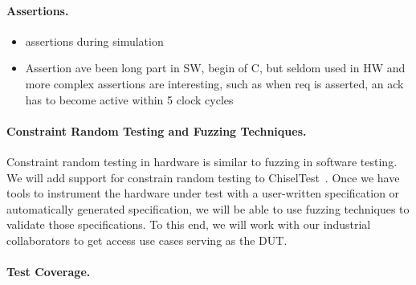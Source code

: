 \documentclass[conference]{IEEEtran}
\begin{document}
\paragraph{Assertions.}

\begin{itemize}
\item assertions during simulation
\item Assertion ave been long part in SW, begin of C, but seldom used in HW and more complex assertions are interesting, such as when req is asserted, an ack has to become active within 5 clock cycles
\end{itemize}

\paragraph{Constraint Random Testing and Fuzzing Techniques.}

Constraint random testing in hardware is similar to fuzzing in software testing.
We will add support for constrain random testing to ChiselTest~\cite{chisel:tester2}.
Once we have tools to instrument the hardware under test with a user-written
specification or automatically generated specification, we will be able to use fuzzing techniques
to validate those specifications. To this end, we will work
with our industrial collaborators to get access use cases serving
as the DUT.

\paragraph{Test Coverage.} %
\end{document}
